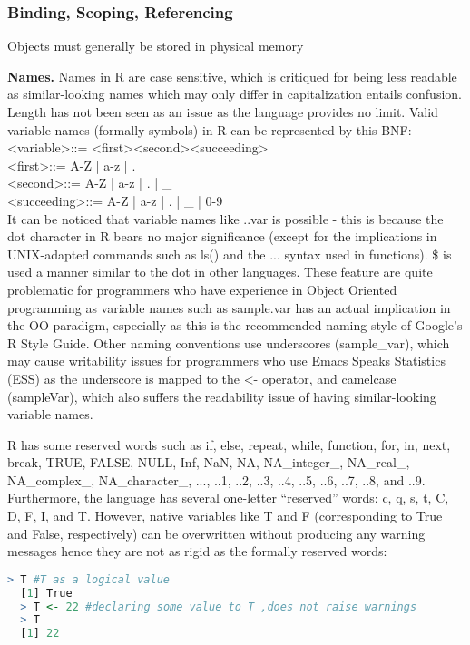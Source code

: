 \documentclass[12pt]{article}
\begin{document}
\subsubsection{Binding, Scoping, Referencing}

Objects must generally be stored in physical memory

\textbf{Names.} Names in R are case sensitive, which is critiqued for being less readable as similar-looking names which may only differ in capitalization entails confusion. Length has not been seen as an issue as the language provides no limit. Valid variable names (formally symbols) in R can be represented by this BNF: \\
\textless variable\textgreater ::= \textless first\textgreater \textless second\textgreater \textless succeeding\textgreater* \\
\textless first\textgreater ::= A-Z | a-z | . \\
\textless second\textgreater ::= A-Z | a-z | . | \_ \\
\textless succeeding\textgreater ::= A-Z | a-z | . | \_ | 0-9 \\

It can be noticed that variable names like ..var is possible - this is because the dot character in R bears no major significance (except for the implications in UNIX-adapted commands such as ls() and the ... syntax used in functions). \$ is used a manner similar to the dot in other languages. These feature are quite problematic for programmers who have experience in Object Oriented programming as variable names such as sample.var has an actual implication in the OO paradigm, especially as this is the recommended naming style of Google's R Style Guide. Other naming conventions use underscores (sample\_var), which may cause writability issues for programmers who use Emacs Speaks Statistics (ESS) as the underscore is mapped to the <- operator, and camelcase (sampleVar), which also suffers the readability issue of having similar-looking variable names.


R has some reserved words such as if, else, repeat, while, function, for, in, next, break, TRUE, FALSE, NULL, Inf, NaN, NA, NA\_integer\_, NA\_real\_, NA\_complex\_, NA\_character\_, ..., ..1, ..2, ..3, ..4, ..5, ..6, ..7, ..8, and ..9.
Furthermore, the language has several one-letter ``reserved'' words: c, q, s, t, C, D, F, I, and T. However, native variables like T and F (corresponding to True and False, respectively) can be overwritten without producing any warning messages hence they are not as rigid as the formally reserved words:
\begin{lstlisting}[language=R]
  > T #T as a logical value
  [1] True
  > T <- 22 #declaring some value to T ,does not raise warnings
  > T
  [1] 22
\end{lstlisting}
\end{document}
